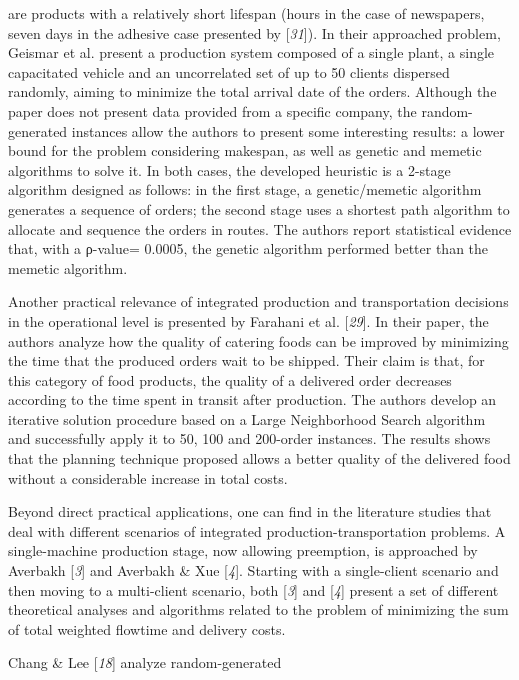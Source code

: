  are products with a relatively short lifespan (hours in the case of newspapers, seven
 days in the adhesive case presented by [\textit{31}]).
 In their approached problem, Geismar et al. present a production system composed of a
 single plant, a single capacitated vehicle and an uncorrelated set of up to 50
 clients dispersed randomly, aiming to minimize the total arrival date of the orders.
 Although the paper does not present data provided from a specific company, the
 random-generated instances allow the authors to present some interesting results: a
 lower bound for the problem considering makespan, as well as genetic and memetic
 algorithms to solve it. In both cases, the developed heuristic is a 2-stage algorithm
 designed as follows: in the first stage, a genetic/memetic algorithm generates a
 sequence of orders; the second stage uses a shortest path algorithm to allocate and
 sequence the orders in routes. The authors report statistical evidence that, with a
 ρ-value= 0.0005, the genetic algorithm performed better than the memetic
 algorithm.\par Another practical relevance of integrated production and transportation decisions in
 the operational level is presented by Farahani et al. [\textit{29}]. In their paper, the authors analyze how the quality of
 catering foods can be improved by minimizing the time that the produced orders wait
 to be shipped. Their claim is that, for this category of food products, the quality
 of a delivered order decreases according to the time spent in transit after
 production. The authors develop an iterative solution procedure based on a Large
 Neighborhood Search algorithm and successfully apply it to 50, 100 and 200-order
 instances. The results shows that the planning technique proposed allows a better
 quality of the delivered food without a considerable increase in total costs.\par Beyond direct practical applications, one can find in the literature studies that
 deal with different scenarios of integrated production-transportation problems. A
 single-machine production stage, now allowing preemption, is approached by Averbakh
 [\textit{3}] and Averbakh \& Xue [\textit{4}]. Starting with a single-client scenario and
 then moving to a multi-client scenario, both [\textit{3}] and [\textit{4}] present a set of
 different theoretical analyses and algorithms related to the problem of minimizing
 the sum of total weighted flowtime and delivery costs.\par Chang \& Lee [\textit{18}] analyze random-generated
